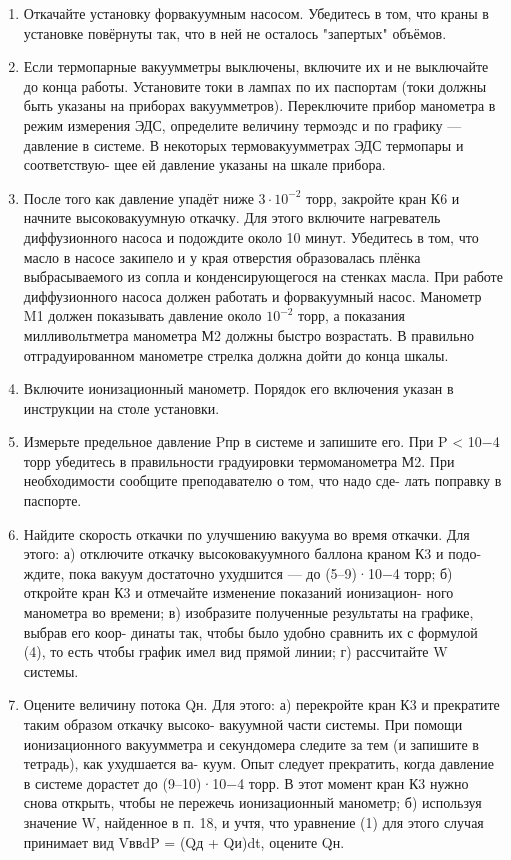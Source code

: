 \documentclass[a4paper,12pt]{article} %
\begin{document}
\begin{enumerate}
\item Откачайте установку форвакуумным насосом. Убедитесь в том, что краны в установке повёрнуты так, что в ней не осталось "запертых" объёмов.
\item Если термопарные вакуумметры выключены, включите их и не выключайте до конца работы. Установите токи в лампах по их паспортам (токи должны быть указаны на приборах вакуумметров). Переключите прибор манометра в режим измерения ЭДС, определите величину термоэдс и по графику — давление в системе.
В некоторых термовакуумметрах ЭДС термопары и соответствую- щее ей давление указаны на шкале прибора.
\item После того как давление упадёт ниже $3 \cdot 10^{-2}$ торр, закройте кран К6 и начните высоковакуумную откачку. Для этого включите нагреватель диффузионного насоса и подождите около 10 минут. Убедитесь в том, что масло в насосе закипело и у края отверстия образовалась плёнка выбрасываемого из сопла и конденсирующегося на стенках масла. При работе диффузионного насоса должен работать и форвакуумный насос.
Манометр M1 должен показывать давление около $10^{-2}$ торр, а показания милливольтметра манометра М2 должны быстро возрастать. В правильно отградуированном манометре стрелка должна дойти до конца шкалы.
\item Включите ионизационный манометр. Порядок его включения указан в инструкции на столе установки.
\item Измерьте предельное давление Pпр в системе и запишите его. При P < 10−4 торр убедитесь в правильности градуировки термоманометра М2. При необходимости сообщите преподавателю о том, что надо сде- лать поправку в паспорте.
\item Найдите скорость откачки по улучшению вакуума во время откачки. Для этого:
а) отключите откачку высоковакуумного баллона краном К3 и подо- ждите, пока вакуум достаточно ухудшится — до (5–9)·10−4 торр;
б) откройте кран К3 и отмечайте изменение показаний ионизацион- ного манометра во времени;
в) изобразите полученные результаты на графике, выбрав его коор- динаты так, чтобы было удобно сравнить их с формулой (4), то есть чтобы график имел вид прямой линии;
г) рассчитайте W системы.
\item Оцените величину потока Qн. Для этого:
а) перекройте кран К3 и прекратите таким образом откачку высоко- вакуумной части системы. При помощи ионизационного вакуумметра и секундомера следите за тем (и запишите в тетрадь), как ухудшается ва- куум. Опыт следует прекратить, когда давление в системе дорастет до (9–10)·10−4 торр. В этот момент кран К3 нужно снова открыть, чтобы не пережечь ионизационный манометр;
б) используя значение W, найденное в п. 18, и учтя, что уравнение (1) для этого случая принимает вид VввdP = (Qд + Qи)dt, оцените Qн.


\end{enumerate}
\end{document}
